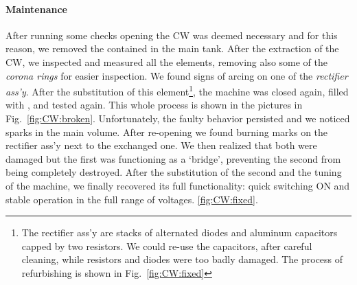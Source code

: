 \begin{refsection}
        \paragraph{Maintenance}
        After running some checks opening the CW was deemed necessary and for this reason, we removed the  contained in the main tank. 
        After the extraction of the CW, we inspected and measured all the elements, removing also some of the \textit{corona rings} for easier inspection. 
        We found signs of arcing on one of the \textit{rectifier ass'y}. 
        After the substitution of this element\footnote{The rectifier ass'y are stacks of alternated diodes and aluminum capacitors capped by two resistors. We could re-use the capacitors, after careful cleaning, while resistors and diodes were too badly damaged. The process of refurbishing is shown in Fig.~\ref{fig:CW:fixed}}, the machine was closed again, filled with , and tested again.
        This whole process is shown in the pictures in Fig.~\ref{fig:CW:broken}.
        Unfortunately, the faulty behavior persisted and we noticed sparks in the main volume. 
        After re-opening we found burning marks on the rectifier ass'y next to the exchanged one.
        We then realized that both were damaged but the first was functioning as a `bridge', preventing the second from being completely destroyed. 
        After the substitution of the second and the tuning of the machine, we finally recovered its full functionality: quick switching ON and stable operation in the full range of voltages.
        \ref{fig:CW:fixed}.


\end{refsection}
